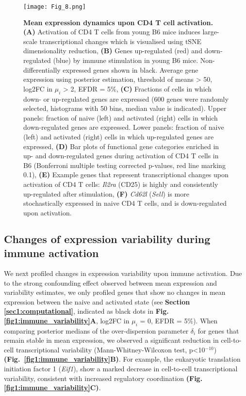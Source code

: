 \begin{figure}[!ht]
\centering
\texttt{[image: Fig\_8.png]}
\caption[Mean expression dynamics upon CD4\plus{} T cell activation]{\textbf{Mean expression dynamics upon CD4\plus{} T cell activation.}\\
\textbf{(A)} Activation of CD4\plus{} T cells from young B6 mice induces large-scale transcriptional changes which is visualised using tSNE dimensionality reduction, \textbf{(B)} Genes up-regulated (red) and down-regulated (blue) by immune stimulation in young B6 mice. Non-differentially expressed genes shown in black. Average gene expression using posterior estimation, threshold of means > 50, log2FC in $\mu_i$ > 2, EFDR = 5\%, \textbf{(C)} Fractions of cells in which down- or up-regulated genes are expressed (600 genes were randomly selected, histograms with 50 bins, median value is indicated). Upper panels: fraction of naive (left) and activated (right) cells in which down-regulated genes are expressed. Lower panels: fraction of naive (left) and activated (right) cells in which up-regulated genes are expressed, \textbf{(D)} Bar plots of functional gene categories enriched in up- and down-regulated genes during activation of CD4\plus{} T cells in B6 (Bonferroni multiple testing corrected p-values, red line marking 0.1), \textbf{(E)} Example genes that represent transcriptional changes upon activation of CD4\plus{} T cells: \textit{Il2ra} (CD25) is highly and consistently up-regulated after stimulation, \textbf{(F)} \textit{Cd62l} (\textit{Sell}) is more stochastically expressed in naive CD4\plus{} T cells, and is down-regulated upon activation.
}
\label{fig1:immune_activation}
\end{figure}

\newpage

\subsection{Changes of expression variability during immune activation}

We next profiled changes in expression variability upon immune activation. Due to the strong confounding effect observed between mean expression and variability estimates, we only profiled genes that show no changes in mean expression between the naive and activated state (see \textbf{Section \ref{sec1:computational}}, indicated as black dots in \textbf{Fig. \ref{fig1:immune_variability}A}, log2FC in $\mu_i$ = 0, EFDR = 5\%). When comparing posterior medians of the over-dispersion parameter $\delta_i$ for genes that remain stable in mean expression, we observed a significant reduction in cell-to-cell transcriptional variability (Mann-Whitney-Wilcoxon test, p<10$^{-10}$) \textbf{(Fig.~\ref{fig1:immune_variability}B)}. For example, the eukaryotic translation initiation factor 1 (\textit{Eif1}), show a marked decrease in cell-to-cell transcriptional variability, consistent with increased regulatory coordination \textbf{(Fig. \ref{fig1:immune_variability}C)}.\\

